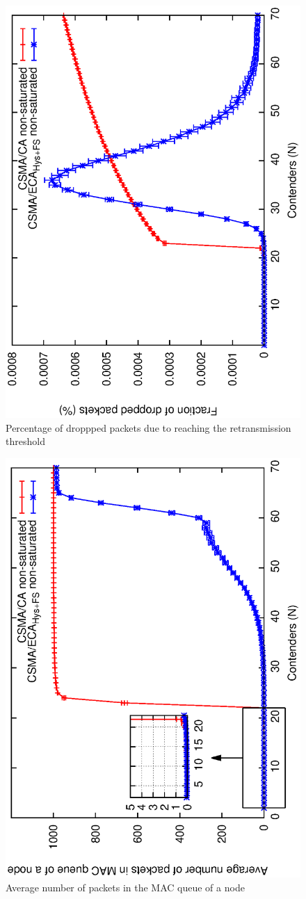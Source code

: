    	\begin{figure}[tb]
		\centering
		\includegraphics[width=0.7\linewidth,angle=-90]{figures/unsaturated/droppedPackets/droppedPacketsDueRET.eps}
		\caption{Percentage of droppped packets due to reaching the retransmission threshold}
		\label{fig:droppedDueToRET}
	\end{figure}
	
	 \begin{figure}[tb]
		\centering
		\includegraphics[width=0.7\linewidth,angle=-90]{figures/unsaturated/queueSize/queueSize-multiplot.eps}
		\caption{Average number of packets in the MAC queue of a node}
		\label{fig:MacQ}
	\end{figure}
	
